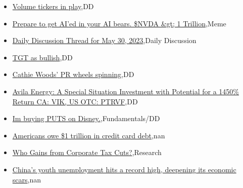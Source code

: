 \documentclass{article}%
\begin{document}
%
\begin{itemize}%
\item%
\href{https://reddit.com/r/wallstreetbets/comments/13voff5/volume\_tickers\_in\_play/}{Volume tickers in play},DD%
\item%
\href{https://reddit.com/r/wallstreetbets/comments/13vntgt/prepare\_to\_get\_aied\_in\_your\_ai\_bears\_nvda\_1/}{Prepare to get AI'ed in your AI bears. \$NVDA \&gt; 1 Trillion},Meme%
\item%
\href{https://reddit.com/r/wallstreetbets/comments/13vm190/daily\_discussion\_thread\_for\_may\_30\_2023/}{Daily Discussion Thread for May 30, 2023},Daily Discussion%
\item%
\href{https://reddit.com/r/wallstreetbets/comments/13vl8fx/tgt\_as\_bullish/}{TGT as bullish},DD%
\item%
\href{https://reddit.com/r/wallstreetbets/comments/13vh0oi/cathie\_woods\_pr\_wheels\_spinning/}{Cathie Woods' PR wheels spinning},DD%
\item%
\href{https://reddit.com/r/Baystreetbets/comments/13va15v/avila\_energy\_a\_special\_situation\_investment\_with/}{Avila Energy: A Special Situation Investment with Potential for a 1450\% Return CA: VIK, US OTC: PTRVF},DD%
\item%
\href{https://reddit.com/r/StockMarket/comments/13vm09f/im\_buying\_puts\_on\_disney/}{Im buying PUTS on Disney.},Fundamentals/DD%
\item%
\href{https://reddit.com/r/Economics/comments/13vnobv/americans\_owe\_1\_trillion\_in\_credit\_card\_debt/}{Americans owe \$1 trillion in credit card debt},nan%
\item%
\href{https://reddit.com/r/Economics/comments/13vbxg8/who\_gains\_from\_corporate\_tax\_cuts/}{Who Gains from Corporate Tax Cuts?},Research%
\item%
\href{https://reddit.com/r/Economics/comments/13vbqny/chinas\_youth\_unemployment\_hits\_a\_record\_high/}{China's youth unemployment hits a record high, deepening its economic scars},nan%
\end{itemize}%
\end{document}

